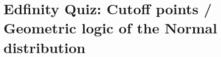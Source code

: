\documentclass[slidestop,compress,mathserif]{beamer}
\makeatletter
\def\chpiv@path{../../Chp 4}
\makeatother
\begin{document}


\section{Edfinity Quiz: Cutoff points / Geometric logic of the Normal distribution}










\end{document}
